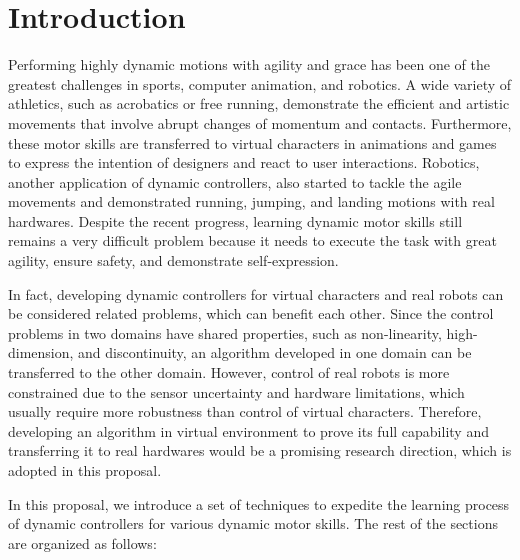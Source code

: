 \chapter{Introduction}


Performing highly dynamic motions with agility and grace has been
one of the greatest challenges in sports, computer animation, and robotics.
A wide variety of athletics, such as acrobatics or free running, demonstrate the
efficient and artistic movements that involve abrupt changes of momentum
and contacts.
Furthermore, these motor skills are transferred to virtual characters 
in animations and games to express the intention of designers
and react to user interactions.
Robotics, another application of dynamic controllers, also started 
to tackle the agile movements and demonstrated
running, jumping, and landing motions with real hardwares.
Despite the recent progress, 
learning dynamic motor skills still remains a very difficult
problem because it needs to execute the task with great agility, 
ensure safety, and demonstrate self-expression.

In fact, developing dynamic controllers for virtual characters and
real robots can be considered related problems,
which can benefit each other.
Since the control problems in two domains have shared properties,
such as non-linearity, high-dimension, and discontinuity,
an algorithm developed in one domain can be transferred 
to the other domain.
However, control of real robots is more constrained
due to the sensor uncertainty and hardware limitations, which 
usually require more robustness than control of virtual characters.
Therefore, developing an algorithm in virtual environment to prove its
full capability and transferring it to real hardwares would be
a promising research direction, which is adopted in this proposal.

In this proposal, we introduce a set of techniques to expedite
the learning process of dynamic controllers for various dynamic motor 
skills. 
The rest of the sections are organized as follows:

